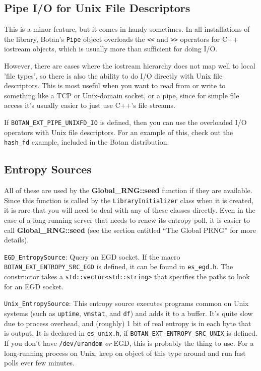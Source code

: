 \documentclass{article}
\newcommand{\filename}[1]{\texttt{#1}}
\newcommand{\macro}[1]{\texttt{#1}}
\newcommand{\function}[1]{\textbf{#1}}
\newcommand{\keyword}[1]{\texttt{#1}}
\newcommand{\type}[1]{\texttt{#1}}
\begin{document}
\subsection{Pipe I/O for Unix File Descriptors}

This is a minor feature, but it comes in handy sometimes. In all
installations of the library, Botan's \type{Pipe} object overloads the
\keyword{<<} and \keyword{>>} operators for C++ iostream objects,
which is usually more than sufficient for doing I/O.

However, there are cases where the iostream hierarchy does not map well to
local 'file types', so there is also the ability to do I/O directly with Unix
file descriptors. This is most useful when you want to read from or write to
something like a TCP or Unix-domain socket, or a pipe, since for simple file
access it's usually easier to just use C++'s file streams.

If \macro{BOTAN\_EXT\_PIPE\_UNIXFD\_IO} is defined, then you can use the
overloaded I/O operators with Unix file descriptors. For an example of this,
check out the \filename{hash\_fd} example, included in the Botan distribution.

\subsection{Entropy Sources}

All of these are used by the \function{Global\_RNG::seed} function if
they are available. Since this function is called by the
\type{LibraryInitializer} class when it is created, it is rare
that you will need to deal with any of these classes directly. Even in
the case of a long-running server that needs to renew its entropy
poll, it is easier to call \function{Global\_RNG::seed} (see the
section entitled ``The Global PRNG'' for more details).

\noindent
\type{EGD\_EntropySource}: Query an EGD socket. If the macro
\macro{BOTAN\_EXT\_ENTROPY\_SRC\_EGD} is defined, it can be found in
\filename{es\_egd.h}. The constructor takes a \type{std::vector<std::string>}
that specifies the paths to look for an EGD socket.

\noindent
\type{Unix\_EntropySource}: This entropy source executes programs common on
Unix systems (such as \filename{uptime}, \filename{vmstat}, and \filename{df})
and adds it to a buffer. It's quite slow due to process overhead, and (roughly)
1 bit of real entropy is in each byte that is output. It is declared in
\filename{es\_unix.h}, if \macro{BOTAN\_EXT\_ENTROPY\_SRC\_UNIX} is
defined. If you don't have \filename{/dev/urandom} \emph{or} EGD, this is
probably the thing to use. For a long-running process on Unix, keep on object
of this type around and run fast polls ever few minutes.
\end{document}
